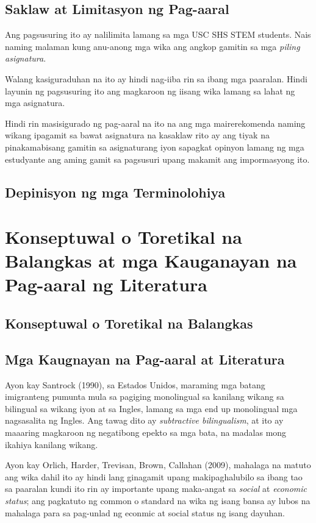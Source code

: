 \documentclass [11pt] {report}
\begin{document}
\pagebreak
\section {Saklaw at Limitasyon ng Pag-aaral}
Ang pagsusuring ito ay nalilimita lamang sa mga USC SHS STEM students. Nais
naming malaman kung anu-anong mga wika ang angkop gamitin sa mga \emph{piling
  asignatura}.

Walang kasiguraduhan na ito ay hindi nag-iiba rin sa ibang mga paaralan. Hindi layunin
ng pagsusuring ito ang magkaroon ng iisang wika lamang sa lahat ng mga
asignatura.

Hindi rin masisigurado ng pag-aaral na ito na ang mga mairerekomenda naming
wikang ipagamit sa bawat asignatura na kasaklaw rito ay ang tiyak na
pinakamabisang gamitin sa asignaturang iyon sapagkat opinyon lamang ng mga
estudyante ang aming gamit sa pagsusuri upang makamit ang impormasyong ito.

\section{Depinisyon ng mga Terminolohiya}

\chapter{Konseptuwal o Toretikal na Balangkas at mga Kauganayan na Pag-aaral ng Literatura}
\section {Konseptuwal o Toretikal na Balangkas}
\pagebreak
\section {Mga Kaugnayan na Pag-aaral at Literatura}
Ayon kay Santrock (1990), sa Estados Unidos, maraming mga batang imigranteng
pumunta mula sa pagiging monolingual sa kanilang wikang sa bilingual sa wikang
iyon at sa Ingles, lamang sa mga end up monolingual mga nagsasalita ng Ingles.
Ang tawag dito ay \emph{subtractive bilingualism}, at ito ay maaaring magkaroon
ng negatibong epekto sa mga bata, na madalas mong ikahiya kanilang wikang.

Ayon kay Orlich, Harder, Trevisan, Brown, Callahan (2009), mahalaga na matuto ang
wika dahil ito ay hindi lang ginagamit upang makipaghalubilo sa ibang tao sa
paaralan kundi ito rin ay importante upang maka-angat sa \emph{social} at
\emph{economic status}; ang pagkatuto ng common o standard na wika ng isang
bansa ay lubos na mahalaga para sa pag-unlad ng econmic at social status ng
isang dayuhan.
\end{document}
